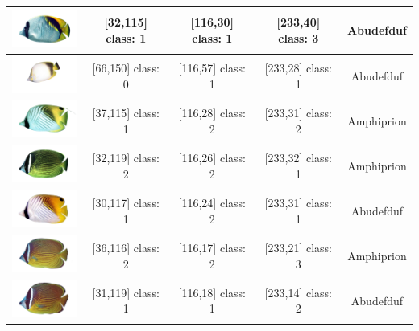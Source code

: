 \begin{longtable}{|c|c|c|c|c|}
	\includegraphics[width=3cm]{gambar/dataset_validasi/Chaetodon03} & [32,115] class: 1 & [116,30] class: 1 & [233,40] class: 3 & Abudefduf \\ \hline
	\includegraphics[width=3cm]{gambar/dataset_validasi/Chaetodon04} & [66,150] class: 0 & [116,57] class: 1 & [233,28] class: 1 & Abudefduf \\ \hline
	\includegraphics[width=3cm]{gambar/dataset_validasi/Chaetodon05} & [37,115] class: 1 & [116,28] class: 2 & [233,31] class: 2 & Amphiprion \\ \hline
	\includegraphics[width=3cm]{gambar/dataset_validasi/Chaetodon06} & [32,119] class: 2 & [116,26] class: 2 & [233,32] class: 1 & Amphiprion \\ \hline
	\includegraphics[width=3cm]{gambar/dataset_validasi/Chaetodon07} & [30,117] class: 1 & [116,24] class: 2 & [233,31] class: 1 & Abudefduf \\ \hline
	\includegraphics[width=3cm]{gambar/dataset_validasi/Chaetodon08} & [36,116] class: 2 & [116,17] class: 2 & [233,21] class: 3 & Amphiprion \\ \hline
	\includegraphics[width=3cm]{gambar/dataset_validasi/Chaetodon09} & [31,119] class: 1 & [116,18] class: 1 & [233,14] class: 2 & Abudefduf \\ \hline

\end{longtable}

